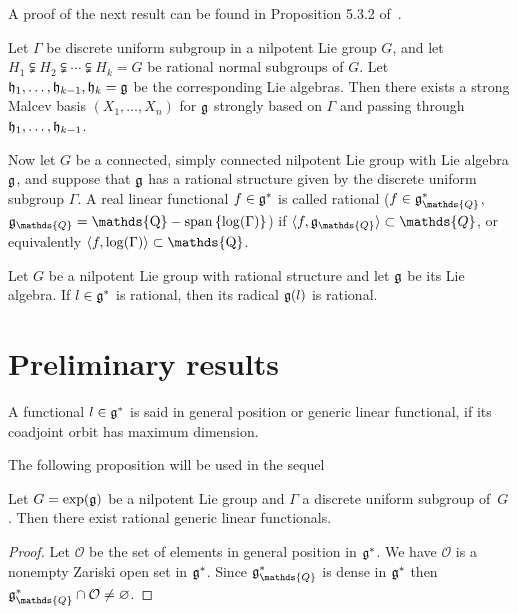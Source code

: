 \documentclass[pdftex]{sigma}
\newcommand{\set}[1]{\left\{#1\right\}}
\DeclareMathOperator{\spannq}{\mathds{Q}-span}
\DeclareMathOperator{\Log}{log} \DeclareMathOperator{\Ad}{Ad}
\def\Log#1{\rm{log}(#1)}
\begin{document}
A  proof of the next result can be found in Proposition 5.3.2 of~\cite{Cor1}.

\begin{proposition}\label{suite-adapte-rational}
Let $\Gamma$ be  discrete uniform subgroup in a nilpotent Lie group
$G$, and let $H_1\subsetneqq H_2\subsetneqq\cdots \subsetneqq H_k =G$
be  rational normal subgroups of $G$. Let $\frak h_1, \ldots, \frak
h_{k-1}, \frak h_k =\frak g$ be the corresponding Lie algebras. Then
there exists a strong Malcev basis $(X_1,\ldots, X_n)$ for $\frak g$
strongly based on $\Gamma$ and passing through $\frak h_1, \ldots,
\frak h_{k-1}$.
\end{proposition}


 Now let $G$ be a connected, simply connected nilpotent Lie
group with Lie algebra $\frak g$, and suppose that $\frak g$ has a
rational structure given by  the discrete uniform subgroup $\Gamma$.
A real linear functional $f \in \frak g^*$ is called rational ($f\in
\frak g_\mathds{Q}^*$,  $\frak
g_\mathds{Q}=\spannq\set{\Log{\Gamma}}$) if $\langle f, \frak
g_\mathds{Q}\rangle \subset \mathds{Q}$, or equivalently $\langle f,
\Log{\Gamma} \rangle \subset \mathds{Q}$.


\begin{proposition} Let $G$ be a nilpotent Lie group with rational
structure and let $\frak g$ be its Lie algebra. If $l\in \frak g^*$
is rational, then its radical $\frak g(l)$ is rational.
\end{proposition}


\section{Preliminary  results}\label{section3}


\begin{definition} A functional $l\in \frak g^*$ is said in general
position or generic linear functional, if its coadjoint orbit has
maximum dimension.
\end{definition}
 The following proposition will be used in the sequel

\begin{proposition}\label{rational-functional}
Let $G = \exp(\frak g)$ be a nilpotent Lie group and $\Gamma$ a
discrete uniform subgroup of~$G$. Then there exist rational generic
linear functionals.
\end{proposition}

\begin{proof}
Let $\mathcal{O}$ be the set of elements in general position in
$\frak g^*$. We have $\mathcal{O}$ is a nonempty Zariski open set
in $\frak g^*$. Since $\frak g_\mathds{Q}^* $ is dense in $\frak
g^*$ then $\frak g_\mathds{Q}^*\cap \mathcal{O} \ne \varnothing$.
\end{proof}
\end{document}

